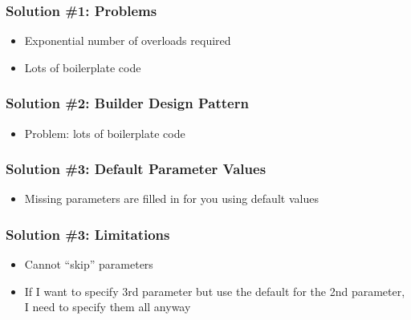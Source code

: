 \documentclass{../ucll-slides}
\begin{document}
\begin{frame}
  \frametitle{Solution \#1: Problems}
  \begin{center}
  \end{center}
  \begin{itemize}
    \item Exponential number of overloads required
    \item Lots of boilerplate code
  \end{itemize}
\end{frame}

\begin{frame}
  \frametitle{Solution \#2: Builder Design Pattern}
  \begin{itemize}
    \item Problem: lots of boilerplate code
  \end{itemize}
\end{frame}

\begin{frame}
  \frametitle{Solution \#3: Default Parameter Values}
  \begin{itemize}
    \item Missing parameters are filled in for you using default values
  \end{itemize}
\end{frame}

\begin{frame}
  \frametitle{Solution \#3: Limitations}
  \begin{itemize}
    \item Cannot ``skip'' parameters
    \item If I want to specify 3rd parameter but use the default for the 2nd parameter, I need
          to specify them all anyway
  \end{itemize}
\end{frame}
\end{document}
